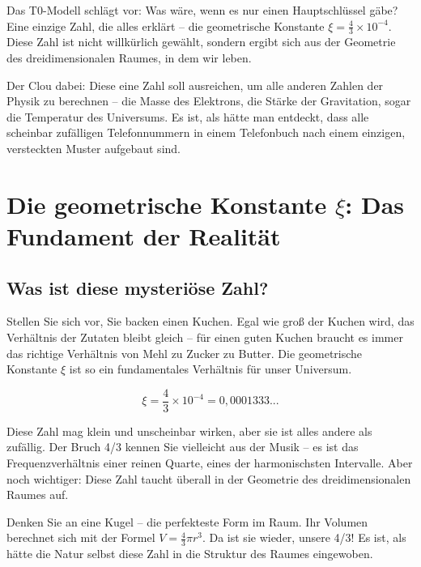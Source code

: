 \documentclass[12pt,a4paper]{article}
\newcommand{\xipar}{\ensuremath{\xi}}
\begin{document}
	\begin{revolutionary}
		Das T0-Modell schlägt vor: Was wäre, wenn es nur einen Hauptschlüssel gäbe? Eine einzige Zahl, die alles erklärt -- die geometrische Konstante $\xipar = \frac{4}{3} \times 10^{-4}$. Diese Zahl ist nicht willkürlich gewählt, sondern ergibt sich aus der Geometrie des dreidimensionalen Raumes, in dem wir leben.
	\end{revolutionary}
	
	Der Clou dabei: Diese eine Zahl soll ausreichen, um alle anderen Zahlen der Physik zu berechnen -- die Masse des Elektrons, die Stärke der Gravitation, sogar die Temperatur des Universums. Es ist, als hätte man entdeckt, dass alle scheinbar zufälligen Telefonnummern in einem Telefonbuch nach einem einzigen, versteckten Muster aufgebaut sind.
	
	\section{Die geometrische Konstante $\xipar$: Das Fundament der Realität}
	
	\subsection{Was ist diese mysteriöse Zahl?}
	
	Stellen Sie sich vor, Sie backen einen Kuchen. Egal wie groß der Kuchen wird, das Verhältnis der Zutaten bleibt gleich -- für einen guten Kuchen braucht es immer das richtige Verhältnis von Mehl zu Zucker zu Butter. Die geometrische Konstante $\xipar$ ist so ein fundamentales Verhältnis für unser Universum.
	
	\begin{equation}
		\boxed{\xipar = \frac{4}{3} \times 10^{-4} = 0,0001333...}
	\end{equation}
	
	Diese Zahl mag klein und unscheinbar wirken, aber sie ist alles andere als zufällig. Der Bruch 4/3 kennen Sie vielleicht aus der Musik -- es ist das Frequenzverhältnis einer reinen Quarte, eines der harmonischsten Intervalle. Aber noch wichtiger: Diese Zahl taucht überall in der Geometrie des dreidimensionalen Raumes auf.
	
	Denken Sie an eine Kugel -- die perfekteste Form im Raum. Ihr Volumen berechnet sich mit der Formel $V = \frac{4}{3}\pi r^3$. Da ist sie wieder, unsere 4/3! Es ist, als hätte die Natur selbst diese Zahl in die Struktur des Raumes eingewoben.
	
\end{document}
